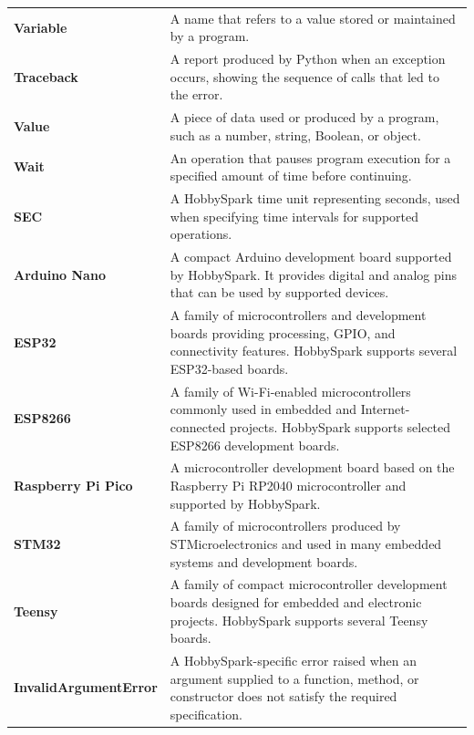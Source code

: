 \documentclass[11pt]{book}
\begin{document}
\begin{longtable}{p{} p{}}
    \textbf{Variable} &
    A name that refers to a value stored or maintained by a program. \\

    \textbf{Traceback} &
    A report produced by Python when an exception occurs, showing the sequence of calls that led to the error. \\

    \textbf{Value} &
    A piece of data used or produced by a program, such as a number, string, Boolean, or object. \\

    \textbf{Wait} &
    An operation that pauses program execution for a specified amount of time before continuing. \\

    \textbf{SEC} &
    A HobbySpark time unit representing seconds, used when specifying time intervals for supported operations. \\

    \textbf{Arduino Nano} &
    A compact Arduino development board supported by HobbySpark. It provides digital and analog pins that can be used by supported devices. \\

    \textbf{ESP32} &
    A family of microcontrollers and development boards providing processing, GPIO, and connectivity features. HobbySpark supports several ESP32-based boards. \\

    \textbf{ESP8266} &
    A family of Wi-Fi-enabled microcontrollers commonly used in embedded and Internet-connected projects. HobbySpark supports selected ESP8266 development boards. \\

    \textbf{Raspberry Pi Pico} &
    A microcontroller development board based on the Raspberry Pi RP2040 microcontroller and supported by HobbySpark. \\

    \textbf{STM32} &
    A family of microcontrollers produced by STMicroelectronics and used in many embedded systems and development boards. \\

    \textbf{Teensy} &
    A family of compact microcontroller development boards designed for embedded and electronic projects. HobbySpark supports several Teensy boards. \\

    \textbf{InvalidArgumentError} &
    A HobbySpark-specific error raised when an argument supplied to a function, method, or constructor does not satisfy the required specification. \\


\end{longtable}
\end{document}
